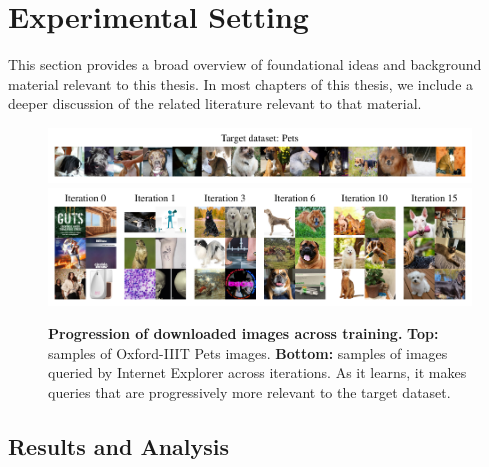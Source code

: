 \chapter{Experimental Setting}
This section provides a broad overview of foundational ideas
and background material relevant to this thesis.
In most chapters of this thesis, we include a deeper
discussion of the related literature relevant to
that material.

\begin{figure}[t]
    \centering
    \includegraphics[width=\linewidth]{figures/pets_targets.pdf}\\
    \vspace{-0.1in}
    \includegraphics[width=\linewidth]{figures/pets-progression-962-2col-3row.pdf}
    \vspace{-0.28in}
    \caption{
    \textbf{Progression of downloaded images across training.} \textbf{Top:} samples of Oxford-IIIT Pets images. \textbf{Bottom:} samples of images queried by Internet Explorer across iterations. As it learns, it makes queries that are progressively more relevant to the target dataset.
    }
    \label{fig:progression}
    \vspace{-0.15in}
\end{figure}

\section{Results and Analysis}
